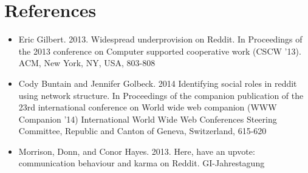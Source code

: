 \documentclass{article} %
\begin{document}
\section{References}
\begin{itemize}
\item Eric Gilbert. 2013. Widespread underprovision on Reddit. In Proceedings of the 2013 conference on Computer supported cooperative work (CSCW '13). ACM, New York, NY, USA, 803-808
\item Cody Buntain and Jennifer Golbeck. 2014 Identifying social roles in reddit using network structure. In Proceedings of the companion publication of the 23rd international conference on World wide web companion (WWW Companion '14) International World Wide Web Conferences Steering Committee, Republic and Canton of Geneva, Switzerland, 615-620
\item Morrison, Donn, and Conor Hayes. 2013. Here, have an upvote: communication behaviour and karma on Reddit. GI-Jahrestagung
\end{itemize}
\end{document}
